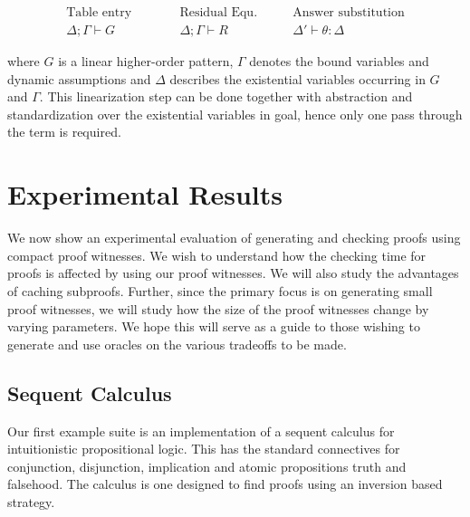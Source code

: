 \documentclass{llncs}
\newcommand{\vd}{\vdash}
\begin{document}
\[
\begin{array}{lll}
\mbox{Table entry}\quad \quad &\quad \mbox{Residual Equ.}\quad &\quad \mbox{Answer substitution}\\
\Delta ; \Gamma \vd G & \quad \Delta ; \Gamma \vd R  & \quad \Delta' \vd \theta : \Delta
\end{array}
\]

where $G$ is a linear higher-order pattern, $\Gamma$ denotes the bound
variables and dynamic assumptions and $\Delta$ describes the
existential variables occurring in $G$ and $\Gamma$. This
linearization step can be done together with abstraction and 
standardization over the existential variables in goal, hence only one
pass through the term is required. 





\section{Experimental Results}

We now show an experimental evaluation of generating and checking
proofs using compact proof witnesses. We wish to understand how the
checking time for proofs is affected by using our proof witnesses. We
will also study the advantages of caching subproofs. Further, since
the primary focus is on generating small proof witnesses, we will
study how the size of the proof witnesses change by varying
parameters. We hope this will serve as a guide to those wishing to 
generate and use oracles on the various tradeoffs to be made.

\subsection{Sequent Calculus}
Our first example suite is an implementation of a sequent calculus 
for intuitionistic propositional logic. This has the standard connectives
for conjunction, disjunction, implication and atomic propositions 
truth and falsehood. The calculus is one designed to find proofs using an 
inversion based strategy.
\end{document}
